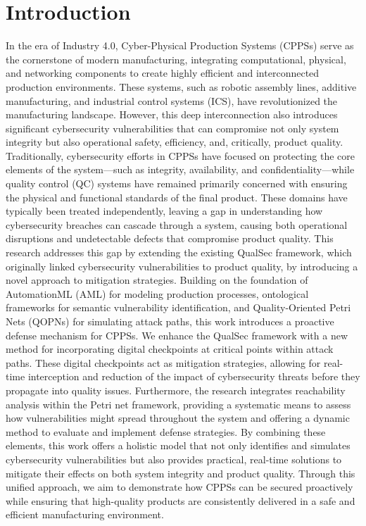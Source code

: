 \documentclass[conference]{IEEEtran}
\begin{document}
\section{Introduction}
In the era of Industry 4.0, Cyber-Physical Production Systems (CPPSs) serve as the cornerstone of modern manufacturing, integrating computational, physical, and networking components to create highly efficient and interconnected production environments. These systems, such as robotic assembly lines, additive manufacturing, and industrial control systems (ICS), have revolutionized the manufacturing landscape. However, this deep interconnection also introduces significant cybersecurity vulnerabilities that can compromise not only system integrity but also operational safety, efficiency, and, critically, product quality.
Traditionally, cybersecurity efforts in CPPSs have focused on protecting the core elements of the system—such as integrity, availability, and confidentiality—while quality control (QC) systems have remained primarily concerned with ensuring the physical and functional standards of the final product. These domains have typically been treated independently, leaving a gap in understanding how cybersecurity breaches can cascade through a system, causing both operational disruptions and undetectable defects that compromise product quality.
This research addresses this gap by extending the existing QualSec framework, which originally linked cybersecurity vulnerabilities to product quality, by introducing a novel approach to mitigation strategies. Building on the foundation of AutomationML (AML) for modeling production processes, ontological frameworks for semantic vulnerability identification, and Quality-Oriented Petri Nets (QOPNs) for simulating attack paths, this work introduces a proactive defense mechanism for CPPSs. We enhance the QualSec framework with a new method for incorporating digital checkpoints at critical points within attack paths. These digital checkpoints act as mitigation strategies, allowing for real-time interception and reduction of the impact of cybersecurity threats before they propagate into quality issues.
Furthermore, the research integrates reachability analysis within the Petri net framework, providing a systematic means to assess how vulnerabilities might spread throughout the system and offering a dynamic method to evaluate and implement defense strategies. By combining these elements, this work offers a holistic model that not only identifies and simulates cybersecurity vulnerabilities but also provides practical, real-time solutions to mitigate their effects on both system integrity and product quality. Through this unified approach, we aim to demonstrate how CPPSs can be secured proactively while ensuring that high-quality products are consistently delivered in a safe and efficient manufacturing environment.
\end{document}
